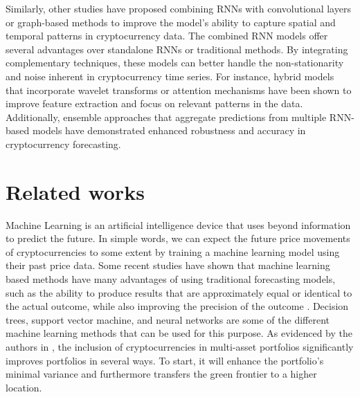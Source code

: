 \documentclass[]{interact}
\theoremstyle{plain}%
\theoremstyle{definition}
\theoremstyle{remark}
\begin{document}
Similarly, other studies have proposed combining RNNs with convolutional
layers or graph-based methods to improve the model's ability to capture
spatial and temporal patterns in cryptocurrency data. The combined RNN
models offer several advantages over standalone RNNs or traditional
methods. By integrating complementary techniques, these models can
better handle the non-stationarity and noise inherent in cryptocurrency
time series. For instance, hybrid models that incorporate wavelet
transforms or attention mechanisms have been shown to improve feature
extraction and focus on relevant patterns in the data. Additionally,
ensemble approaches that aggregate predictions from multiple RNN-based
models have demonstrated enhanced robustness and accuracy in
cryptocurrency forecasting.

\section{Related works}\label{related-works}

Machine Learning is an artificial intelligence device that uses beyond
information to predict the future. In simple words, we can expect the
future price movements of cryptocurrencies to some extent by training a
machine learning model using their past price data. Some recent studies
have shown that machine learning based methods have many advantages of
using traditional forecasting models, such as the ability to produce
results that are approximately equal or identical to the actual outcome,
while also improving the precision of the outcome \citep{hitam2021}.
Decision trees, support vector machine, and neural networks are some of
the different machine learning methods that can be used for this
purpose. As evidenced by the authors in \citep{andrianto17}, the
inclusion of cryptocurrencies in multi-asset portfolios significantly
improves portfolios in several ways. To start, it will enhance the
portfolio's minimal variance and furthermore transfers the green
frontier to a higher location.
\end{document}
